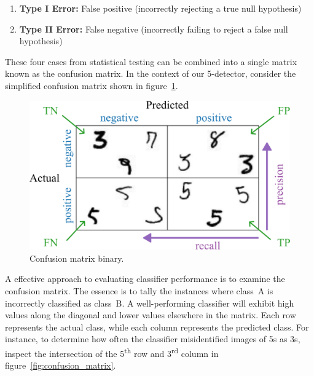 \documentclass[12pt,letter]{article}
\begin{document}
\begin{enumerate}
\item[] \textbf{Type I Error:} False positive (incorrectly rejecting a true null hypothesis)
\item[] \textbf{Type II Error:} False negative (incorrectly failing to reject a false null hypothesis)
\end{enumerate}

These four cases from statistical testing can be combined into a single matrix known as the confusion matrix. In the context of our 5-detector, consider the simplified confusion matrix shown in figure~\ref{fig:confusion_matrix_binary}.

\begin{figure}[H]
    \centering
    \includegraphics[]{../figures/confusion_matrix_binary.png}
    \caption{Confusion matrix binary.}
    \label{fig:confusion_matrix_binary}
\end{figure}


 A effective approach to evaluating classifier performance is to examine the confusion matrix. The essence is to tally the instances where class~A is incorrectly classified as class~B. A well-performing classifier will exhibit high values along the diagonal and lower values elsewhere in the matrix. Each row represents the actual class, while each column represents the predicted class. For instance, to determine how often the classifier misidentified images of 5s as 3s, inspect the intersection of the 5\textsuperscript{th} row and 3\textsuperscript{rd} column in figure~\ref{fig:confusion_matrix}.
\end{document}
